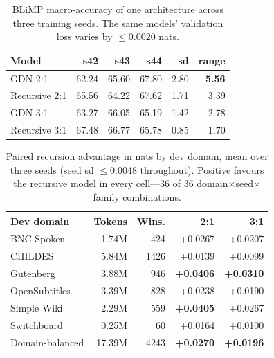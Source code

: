 \documentclass[11pt]{article}
\begin{document}
\begin{table}[t]
\centering
\footnotesize
\setlength{\tabcolsep}{4pt}
\begin{tabular}{lrrrrr}
\toprule
Model & s42 & s43 & s44 & sd & range \\
\midrule
GDN 2:1        & 62.24 & 65.60 & 67.80 & 2.80 & \textbf{5.56} \\
Recursive 2:1  & 65.56 & 64.22 & 67.62 & 1.71 & 3.39 \\
GDN 3:1        & 63.27 & 66.05 & 65.19 & 1.42 & 2.78 \\
Recursive 3:1  & 67.48 & 66.77 & 65.78 & 0.85 & 1.70 \\
\bottomrule
\end{tabular}
\caption{BLiMP macro-accuracy of one architecture across three training seeds. The same models' validation loss varies by ${\leq}0.0020$ nats.}
\label{tab:blimpnoise}
\end{table}

\begin{table}[t]
\centering
\footnotesize
\setlength{\tabcolsep}{3pt}
\begin{tabular}{lrrrr}
\toprule
Dev domain & Tokens & Wins. & 2:1 & 3:1 \\
\midrule
BNC Spoken     & 1.74M & 424  & +0.0267 & +0.0207 \\
CHILDES        & 5.84M & 1426 & +0.0139 & +0.0099 \\
Gutenberg      & 3.88M & 946  & \textbf{+0.0406} & \textbf{+0.0310} \\
OpenSubtitles  & 3.39M & 828  & +0.0238 & +0.0190 \\
Simple Wiki    & 2.29M & 559  & \textbf{+0.0405} & +0.0267 \\
Switchboard    & 0.25M & 60   & +0.0164 & +0.0100 \\
\midrule
Domain-balanced & 17.39M & 4243 & \textbf{+0.0270} & \textbf{+0.0196} \\
\bottomrule
\end{tabular}
\caption{Paired recursion advantage in nats by dev domain, mean over three seeds (seed sd $\leq$0.0048 throughout). Positive favours the recursive model in every cell---36 of 36 domain$\times$seed$\times$family combinations.}
\label{tab:domains}
\end{table}
\end{document}
